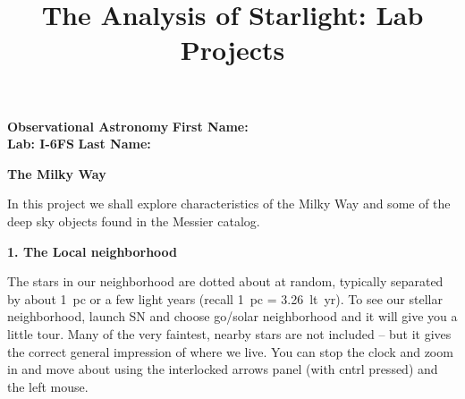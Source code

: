 \documentclass[12pt]{article}
\title{The Analysis of Starlight: Lab Projects}
\begin{document}
\setcounter{page}{1}
\setcounter{equation}{0}
\pagestyle{plain}
\thispagestyle{empty}  %
\newcommand{\kms}{\hbox{km\,s$^{\rm -1}$}}
\def\lo {\ifmmode {\,{\it L}\solar} \else $\,L$\solar\fi}       %
\def\my {\ifmmode {\,{\it M}\solar\,{\rm yr^{-1}}}              %
        \else {$\,M$\solar$\,$yr$^{\rm -1}$}\fi}
\def\BD {BD$\,$+30{\degr}3639}
\def\HUNO{\rm H$\,$I}                   %
\def\HDOS{\rm H$_2$}                    %
\def\arcsec{\ifmmode {^{\scriptscriptstyle\prime\prime}}
          \else $^{\scriptscriptstyle\prime\prime}$\fi}
\def\arcmin{\ifmmode {^{\scriptscriptstyle\prime}}
          \else $^{\scriptscriptstyle\prime}$\fi}
\def\deg{\ifmmode^\circ\else$^\circ$\fi}







\noindent
{\bf Observational Astronomy    \hfill} {\bf First Name:\makebox[4cm]{\hrulefill}}\\
{\bf Lab: I-6FS} \hfill {\bf Last Name:\makebox[4cm]{\hrulefill}}


\bigskip

\medskip

\noindent
{\hfill \Large {\bf The Milky Way} \hfill}


\bigskip

\noindent
In this project we shall explore characteristics of the Milky Way and
some of the deep sky objects found in the Messier catalog.


\medskip \bigskip
\noindent
{\bf 1. The Local neighborhood} 

\medskip\noindent
The stars in our neighborhood are
dotted about at random, typically separated by about 1~pc or a few
light years (recall 1~pc = 3.26~lt~yr).  
To see our stellar neighborhood, launch SN and choose go/solar neighborhood
and it will give you a little tour. Many of the very faintest, nearby
stars are not included -- but it gives the correct general impression
of where we live. You can stop the clock and zoom in and move  about
using the interlocked arrows panel (with cntrl pressed) and the left
mouse. 
\end{document}
